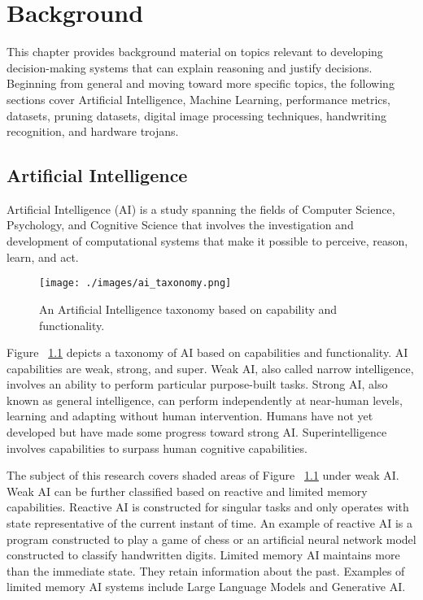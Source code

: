 \chapter{Background} \label{ch:background}

This chapter provides background material on topics relevant to developing
decision-making systems that can explain reasoning and justify decisions.
Beginning from general and moving toward more specific topics, the following
sections cover Artificial Intelligence, Machine Learning, performance metrics,
datasets, pruning datasets, digital image processing techniques, handwriting
recognition, and hardware trojans.

\section{Artificial Intelligence}\label{sec:ai}

Artificial Intelligence (AI) is a study spanning the fields of Computer Science,
Psychology, and Cognitive Science that involves the investigation and
development of computational systems that make it possible to perceive, reason,
learn, and act\cite{winston1992artificial, simon1995artificial,
russell2016artificial, tzimas2021legal}.

\begin{figure}[h]
    \texttt{[image: ./images/ai\_taxonomy.png]}
    \caption{An Artificial Intelligence taxonomy based on capability and functionality.}
    \label{fig:ai_taxonomy}
\end{figure}

Figure ~\ref{fig:ai_taxonomy} depicts a taxonomy of AI based on capabilities and
functionality. AI capabilities are weak, strong, and super. Weak AI, also called
narrow intelligence, involves an ability to perform particular purpose-built
tasks. Strong AI, also known as general intelligence, can perform independently
at near-human levels, learning and adapting without human intervention. Humans
have not yet developed but have made some progress toward strong AI.
Superintelligence involves capabilities to surpass human cognitive
capabilities\cite{tzimas2021legal, samoili2020ai, Breen2024}.

The subject of this research covers shaded areas of Figure
~\ref{fig:ai_taxonomy} under weak AI. Weak AI can be further classified based on
reactive and limited memory capabilities. Reactive AI is constructed for
singular tasks and only operates with state representative of the current
instant of time. An example of reactive AI is a program constructed to play a
game of chess or an artificial neural network model constructed to classify
handwritten digits. Limited memory AI maintains more than the immediate state.
They retain information about the past. Examples of limited memory AI systems
include Large Language Models and Generative AI\cite{schossau2023towards}.

